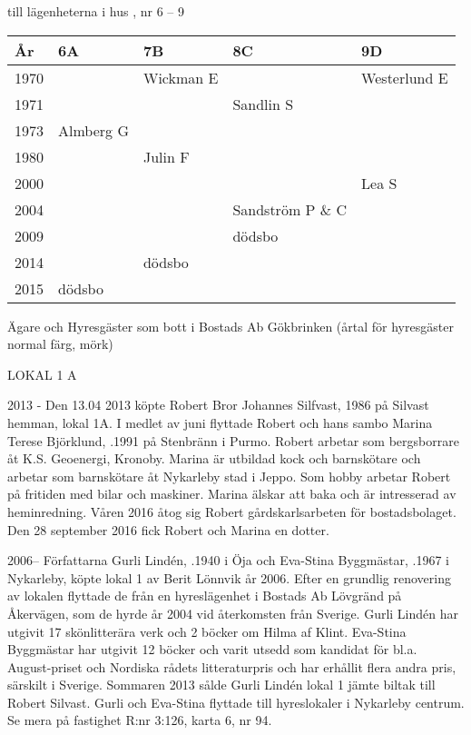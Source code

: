  till lägenheterna i hus , nr 6 – 9
\begin{center}
  \begin{tabular}{l l l l l}
    År & 6A & 7B & 8C & 9D \\ \hline
    1970 &   & Wickman E &   & Westerlund E \\
    1971 &   &   & Sandlin S &  \\
    1973 & Almberg G &   &   &  \\
    1980 &   & Julin F &   &  \\
    2000 &   &   &   & Lea S \\
    2004 &   &   & Sandström P \& C &  \\
    2009 &   &   & dödsbo &  \\
    2014 &   & dödsbo &   &  \\
    2015 & dödsbo &   &   &  \\
  \end{tabular}
\end{center}

Ägare och Hyresgäster som bott i Bostads Ab Gökbrinken (årtal för hyresgäster normal färg,  mörk)

LOKAL 1 A

 2013 -
Den 13.04 2013 köpte Robert Bror Johannes Silfvast,  1986 på Silvast hemman, lokal 1A.  I medlet av juni flyttade Robert och hans sambo Marina Terese Björklund, .1991 på Stenbränn i Purmo. Robert arbetar som bergsborrare åt K.S. Geoenergi, Kronoby. Marina är utbildad kock och barnskötare och arbetar som barnskötare åt Nykarleby stad i Jeppo. Som hobby arbetar Robert på fritiden med bilar och maskiner. Marina älskar att baka och är intresserad av heminredning. Våren 2016 åtog sig Robert gårdskarlsarbeten för bostadsbolaget. Den 28 september 2016 fick Robert och Marina en dotter.

	2006--
Författarna Gurli Lindén, .1940 i Öja och Eva-Stina Byggmästar, .1967 i Nykarleby, köpte lokal 1 av Berit Lönnvik år 2006. Efter en grundlig renovering av lokalen flyttade de från en hyreslägenhet i Bostads Ab Lövgränd på Åkervägen, som de hyrde år 2004 vid återkomsten från Sverige. Gurli Lindén har utgivit 17 skönlitterära verk och 2 böcker om Hilma af Klint. Eva-Stina Byggmästar har utgivit 12 böcker och varit utsedd som kandidat för bl.a. August-priset och Nordiska rådets litteraturpris och har erhållit flera andra pris, särskilt i Sverige. Sommaren 2013 sålde Gurli Lindén lokal 1 jämte biltak till Robert Silvast. Gurli och Eva-Stina flyttade till  hyreslokaler i Nykarleby centrum. Se mera på fastighet R:nr 3:126, karta 6, nr 94.

